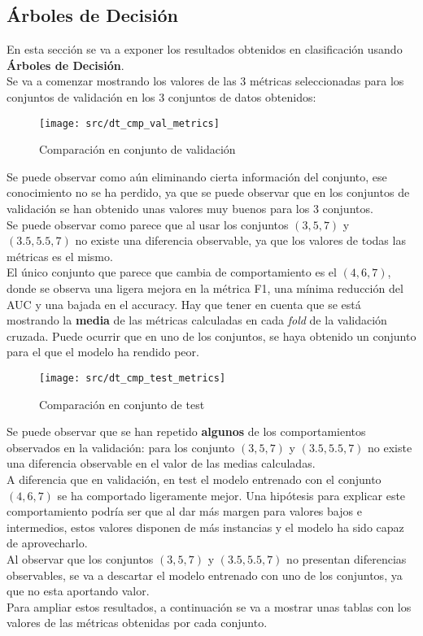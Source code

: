 \subsection{Árboles de Decisión}
\label{class:dt1}
En esta sección se va a exponer los resultados obtenidos en clasificación usando \textbf{Árboles de Decisión}.\\
Se va a comenzar mostrando los valores de las 3 métricas seleccionadas para los conjuntos de validación en los 3 conjuntos de datos obtenidos:
\begin{figure}[H]
	\centering
	\texttt{[image: src/dt\_cmp\_val\_metrics]}
	\caption{Comparación en conjunto de validación}
	\label{fig:dtre_class_val}
\end{figure}
Se puede observar como aún eliminando cierta información del conjunto, ese conocimiento no se ha perdido, ya que se puede observar que en los conjuntos de validación se han obtenido unas valores muy buenos para los 3 conjuntos. \\
\linebreak
Se puede observar como parece que al usar los conjuntos $(3,5,7)$ y $(3.5,5.5,7)$ no existe una diferencia observable, ya que los valores de todas las métricas es el mismo. \\
El único conjunto que parece que cambia de comportamiento es el $(4,6,7)$, donde se observa una ligera mejora en la métrica F1, una mínima reducción del AUC y una bajada en el accuracy. Hay que tener en cuenta que se está mostrando la \textbf{media} de las métricas calculadas en cada \textit{fold} de la validación cruzada. Puede ocurrir que en uno de los conjuntos, se haya obtenido un conjunto para el que el modelo ha rendido peor.
\clearpage
\begin{figure}[H]
	\centering
	\texttt{[image: src/dt\_cmp\_test\_metrics]}
	\caption{Comparación en conjunto de test}
	\label{fig:dtre_class_testl}
\end{figure}
Se puede observar que se han repetido \textbf{algunos} de los comportamientos observados en la validación: para los conjunto $(3,5,7)$ y $(3.5,5.5,7)$ no existe una diferencia observable en el valor de las medias calculadas. \\
A diferencia que en validación, en test el modelo entrenado con el conjunto $(4,6,7)$ se ha comportado ligeramente mejor. Una hipótesis para explicar este comportamiento podría ser que al dar más margen para valores bajos e intermedios, estos valores disponen de más instancias y el modelo ha sido capaz de aprovecharlo.\\
\linebreak
Al observar que los conjuntos $(3,5,7)$ y $(3.5,5.5,7)$ no presentan diferencias observables, se va a descartar el modelo entrenado con uno de los conjuntos, ya que no esta aportando valor.\\
\linebreak
Para ampliar estos resultados, a continuación se va a mostrar unas tablas con los valores de las métricas obtenidas por cada conjunto.
